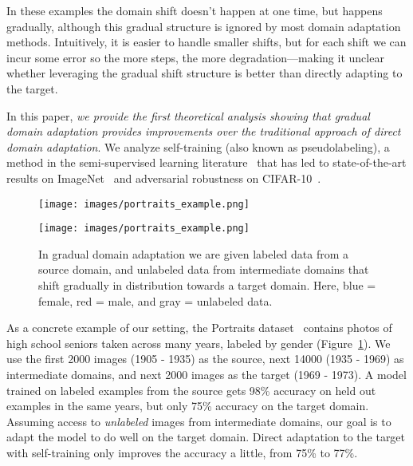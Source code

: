 \documentclass[11pt]{article}
\begin{document}
In these examples the domain shift doesn't happen at one time, but happens gradually, although this gradual structure is ignored by most domain adaptation methods.
Intuitively, it is easier to handle smaller shifts, but for each shift we can incur some error so the more steps, the more degradation---making it unclear whether leveraging the gradual shift structure is better than directly adapting to the target.

In this paper, \emph{we provide the first theoretical analysis showing that gradual domain adaptation provides improvements over the traditional approach of direct domain adaptation}. We analyze self-training (also known as pseudolabeling), a method in the semi-supervised learning literature~\cite{chapelle2006semisupervised} that has led to state-of-the-art results on ImageNet~\cite{xie2020selftraining} and adversarial robustness on CIFAR-10~\cite{uesato2019are, carmon2019unlabeled, najafi2019robustness}. 

\begin{figure}[t]
\begin{center}
\ifdefined\usearxivstyle
\centerline{\texttt{[image: images/portraits\_example.png]}}
\else
\centerline{\texttt{[image: images/portraits\_example.png]}}
\fi
\caption{In gradual domain adaptation we are given labeled data from a source domain, and unlabeled data from intermediate domains that shift gradually in distribution towards a target domain. Here, blue = female, red = male, and gray = unlabeled data.}
\label{fig:portraits_example}
\end{center}
\vskip -0.3in
\end{figure}

As a concrete example of our setting, the Portraits dataset~\cite{ginosar2017portraits} contains photos of high school seniors taken across many years, labeled by gender (Figure~\ref{fig:portraits_example}).
We use the first 2000 images (1905 - 1935) as the source, next 14000 (1935 - 1969) as intermediate domains, and next 2000 images as the target (1969 - 1973). A model trained on labeled examples from the source gets 98\% accuracy on held out examples in the same years, but only 75\% accuracy on the target domain. Assuming access to \emph{unlabeled} images from intermediate domains, our goal is to adapt the model to do well on the target domain. Direct adaptation to the target with self-training only improves the accuracy a little, from 75\% to 77\%.
\end{document}
